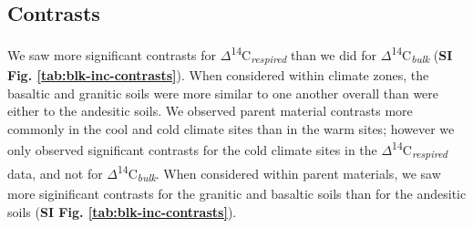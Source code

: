 \documentclass[english,man,floatsintext]{apa6}
\begin{document}
\hypertarget{contrasts}{%
\subsection{Contrasts}\label{contrasts}}

We saw more significant contrasts for \(\Delta\)\textsuperscript{14}C\textsubscript{\emph{respired}} than we did for \(\Delta\)\textsuperscript{14}C\textsubscript{\emph{bulk}} (\textbf{SI Fig. \ref{tab:blk-inc-contrasts}}). When considered within climate zones, the basaltic and granitic soils were more similar to one another overall than were either to the andesitic soils. We observed parent material contrasts more commonly in the cool and cold climate sites than in the warm sites; however we only observed significant contrasts for the cold climate sites in the \(\Delta\)\textsuperscript{14}C\textsubscript{\emph{respired}} data, and not for \(\Delta\)\textsuperscript{14}C\textsubscript{\emph{bulk}}. When considered within parent materials, we saw more siginificant contrasts for the granitic and basaltic soils than for the andesitic soils (\textbf{SI Fig. \ref{tab:blk-inc-contrasts}}).



\begingroup\fontsize{10}{12}\selectfont
\end{document}
